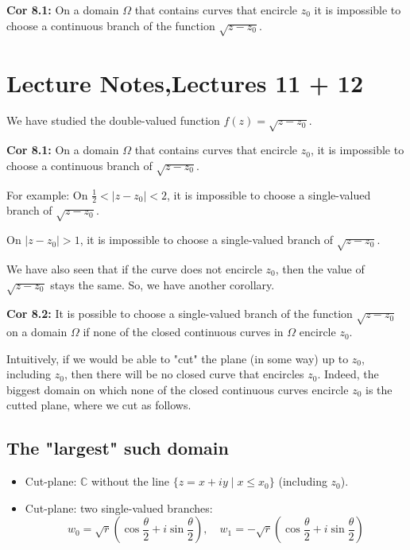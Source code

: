 \documentclass{article}
\begin{document}
\textbf{Cor 8.1:} On a domain $\Omega$ that contains curves that encircle $z_0$ it is impossible to choose a continuous branch of the function $\sqrt{z - z_0}$.

\section*{Lecture Notes,Lectures 11 + 12}

We have studied the double-valued function \( f(z) = \sqrt{z - z_0} \).

\textbf{Cor 8.1:} On a domain \( \Omega \) that contains curves that encircle \( z_0 \), 
it is impossible to choose a continuous branch of \( \sqrt{z - z_0} \).

For example: On \( \frac{1}{2} < |z - z_0| < 2 \), it is impossible to choose a single-valued branch of \( \sqrt{z - z_0} \).

On \( |z - z_0| > 1 \), it is impossible to choose a single-valued branch of \( \sqrt{z - z_0} \).

We have also seen that if the curve does not encircle \( z_0 \), then the value of \( \sqrt{z - z_0} \) stays the same. 
So, we have another corollary.

\textbf{Cor 8.2:} It is possible to choose a single-valued branch of the function \( \sqrt{z - z_0} \) on a domain \( \Omega \) 
if none of the closed continuous curves in \( \Omega \) encircle \( z_0 \).

Intuitively, if we would be able to "cut" the plane (in some way) up to \( z_0 \), including \( z_0 \), then there will be no closed curve that encircles \( z_0 \).
Indeed, the biggest domain on which none of the closed continuous curves encircle \( z_0 \) is the cutted plane, where we cut as follows.

\subsection*{The "largest" such domain}
\begin{itemize}
    \item Cut-plane: \( \mathbb{C} \) without the line \( \{ z = x + iy \mid x \leq x_0 \} \) (including \( z_0 \)).
    \item Cut-plane: two single-valued branches:
    \[
        w_0 = \sqrt{r} (\cos \frac{\theta}{2} + i \sin \frac{\theta}{2}), \quad 
        w_1 = -\sqrt{r} (\cos \frac{\theta}{2} + i \sin \frac{\theta}{2})
    \]
\end{itemize}
\end{document}
